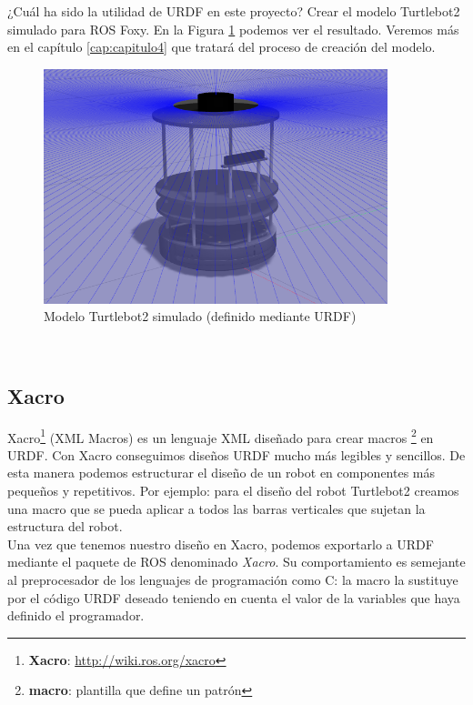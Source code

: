 ¿Cuál ha sido la utilidad de URDF en este proyecto? Crear el modelo Turtlebot2 simulado para ROS Foxy. En la Figura \ref{fig:modelo_turtlebot2_simulado} podemos ver el resultado. Veremos más en el capítulo \ref{cap:capitulo4} que tratará del proceso de creación del modelo.
\begin{figure} [H]
  \begin{center}
    \includegraphics[width=10cm]{imagenes/cap3/turtlebot2-sim.png}
  \end{center}
  \caption{Modelo Turtlebot2 simulado (definido mediante URDF)}
  \label{fig:modelo_turtlebot2_simulado}
\end{figure}\




\subsection{Xacro}
\label{subsec:xacro}

Xacro\footnote{\textbf{Xacro}: \url{http://wiki.ros.org/xacro}} (XML Macros) es un lenguaje XML diseñado para crear macros \footnote{\textbf{macro}: plantilla que define un patrón} en URDF. Con Xacro conseguimos diseños URDF mucho más legibles y sencillos. De esta manera podemos estructurar el diseño de un robot en componentes más pequeños y repetitivos. Por ejemplo: para el diseño del robot Turtlebot2 creamos una macro que se pueda aplicar a todos las barras verticales que sujetan la estructura del robot.\\

Una vez que tenemos nuestro diseño en Xacro, podemos exportarlo a URDF mediante el paquete de ROS denominado \textit{Xacro}. Su comportamiento es semejante al preprocesador de los lenguajes de programación como C: la macro la sustituye por el código URDF deseado teniendo en cuenta el valor de la variables que haya definido el programador.\\

